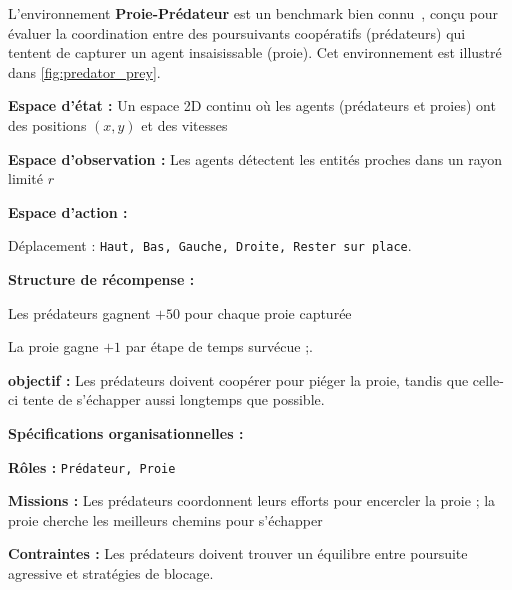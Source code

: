 L'environnement \textbf{Proie-Prédateur} est un benchmark  bien connu~\cite{lowe2017multi}, conçu pour évaluer la coordination entre des poursuivants coopératifs (prédateurs) qui tentent de capturer un agent insaisissable (proie). Cet environnement est illustré dans \autoref{fig:predator_prey}.
%
\begin{enumerate*}[label={\roman*)}, itemjoin={; \quad}]
  \item \textbf{Espace d'état :} Un espace 2D continu où les agents (prédateurs et proies) ont des positions $(x, y)$ et des vitesses
  \item \textbf{Espace d'observation :} Les agents détectent les entités proches dans un rayon limité $r$
  \item \textbf{Espace d'action :}
  \begin{enumerate*}[label={\roman*)}, itemjoin={; \quad}]
    \item Déplacement : \texttt{Haut, Bas, Gauche, Droite, Rester sur place}.
  \end{enumerate*}
  \item \textbf{Structure de récompense :}
  \begin{enumerate*}[label={\roman*)}, itemjoin={; \quad}]
    \item Les prédateurs gagnent $+50$ pour chaque proie capturée
    \item La proie gagne $+1$ par étape de temps survécue ;.
  \end{enumerate*}
  \item \textbf{objectif :} Les prédateurs doivent coopérer pour piéger la proie, tandis que celle-ci tente de s'échapper aussi longtemps que possible.
\end{enumerate*}
%
\textbf{Spécifications organisationnelles :}
\begin{enumerate*}[label={\roman*)}, itemjoin={; \quad}]
  \item \textbf{Rôles :} \texttt{Prédateur, Proie}
  \item \textbf{Missions :} Les prédateurs coordonnent leurs efforts pour encercler la proie ; la proie cherche les meilleurs chemins pour s'échapper
  \item \textbf{Contraintes :} Les prédateurs doivent trouver un équilibre entre poursuite agressive et stratégies de blocage.
\end{enumerate*}
%
